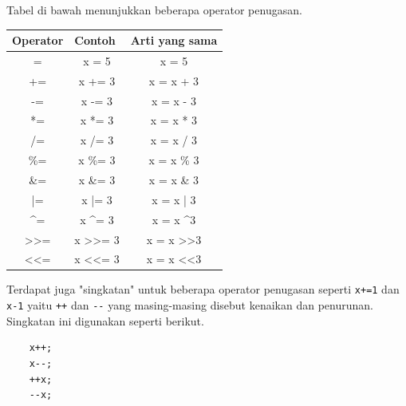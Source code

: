 Tabel di bawah menunjukkan beberapa operator penugasan.
\begin{center}
	\begin{tabular}{|c|c|c|}
		\hline
		\multicolumn{1}{|l|}{Operator} & \multicolumn{1}{l|}{Contoh}       & \multicolumn{1}{l|}{Arti yang sama}  \\ \hline
		=   & x = 5   & x = 5      \\ \hline
		+=  & x += 3  & x = x + 3  \\ \hline
		-=  & x -= 3  & x = x - 3  \\ \hline
		*=  & x *= 3  & x = x * 3  \\ \hline
		/=  & x /= 3  & x = x / 3  \\ \hline
		\%= & x \%= 3 & x = x \% 3 \\ \hline
		\&= & x \&= 3 & x = x \& 3 \\ \hline
		|=  & x |= 3  & x = x | 3  \\ \hline
		\textasciicircum{}=            & x \textasciicircum{}= 3           & x = x \textasciicircum 3           \\ \hline
		\textgreater{}\textgreater{}=  & x \textgreater{}\textgreater{}= 3 & x = x \textgreater{}\textgreater 3 \\ \hline
		\textless{}\textless{}=        & x \textless{}\textless{}= 3       & x = x \textless{}\textless 3       \\ \hline
	\end{tabular}
\end{center}
Terdapat juga "singkatan" untuk beberapa operator penugasan seperti \verb*|x+=1| dan \verb*|x-1| yaitu \verb*|++| dan \verb*|--| yang masing-masing disebut kenaikan dan penurunan.
Singkatan ini digunakan seperti berikut.
\begin{verbatim}
    x++;
    x--;
    ++x;
    --x;
\end{verbatim}

